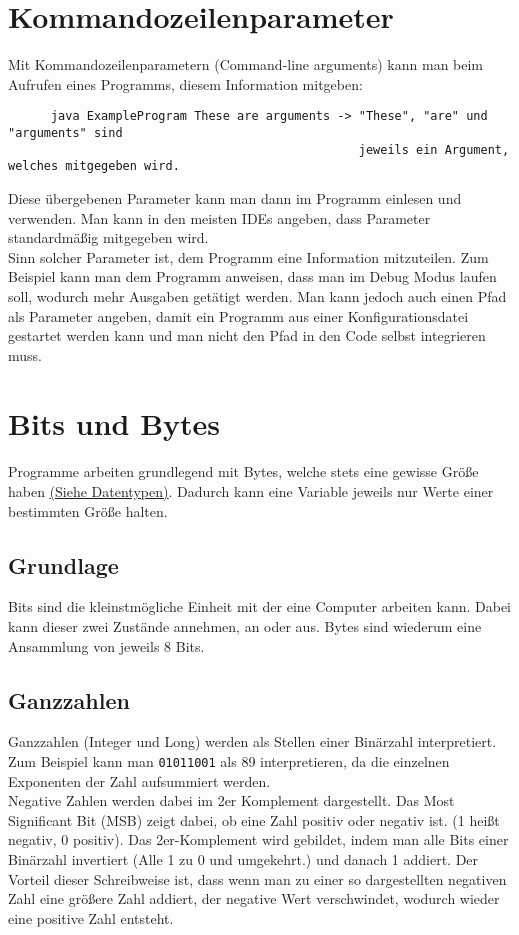 \documentclass{article}
\begin{document}
	  \section{Kommandozeilenparameter}
	  Mit Kommandozeilenparametern (Command-line arguments) kann man beim Aufrufen eines Programms, diesem Information mitgeben:
	  \begin{verbatim}
	  java ExampleProgram These are arguments -> "These", "are" und "arguments" sind 
	                                             jeweils ein Argument, welches mitgegeben wird.
	  \end{verbatim}
	  Diese übergebenen Parameter kann man dann im Programm einlesen und verwenden. Man kann in den meisten IDEs angeben, dass Parameter standardmäßig mitgegeben wird. \\
	  Sinn solcher Parameter ist, dem Programm eine Information mitzuteilen. Zum Beispiel kann man dem Programm anweisen, dass man im Debug Modus laufen soll, wodurch mehr Ausgaben getätigt werden. Man kann jedoch auch einen Pfad als Parameter angeben, damit ein Programm aus einer Konfigurationsdatei gestartet werden kann und man nicht den Pfad in den Code selbst integrieren muss.
	  \section{Bits und Bytes}
	  Programme arbeiten grundlegend mit Bytes, welche stets eine gewisse Größe haben \hyperref[sec:Datentypen]{\underline{(Siehe Datentypen)}}. Dadurch kann eine Variable jeweils nur Werte einer bestimmten Größe halten.
	  \subsection{Grundlage}
	  Bits sind die kleinstmögliche Einheit mit der eine Computer arbeiten kann. Dabei kann dieser zwei Zustände annehmen, an oder aus. Bytes sind wiederum eine Ansammlung von jeweils 8 Bits.
	  \subsection{Ganzzahlen}
	  Ganzzahlen (Integer und Long) werden als Stellen einer Binärzahl interpretiert. \\
	  Zum Beispiel kann man \verb|01011001| als 89 interpretieren, da die einzelnen Exponenten der Zahl aufsummiert werden. \\
	  Negative Zahlen werden dabei im 2er Komplement dargestellt. Das Most Significant Bit (MSB) zeigt dabei, ob eine Zahl positiv oder negativ ist. (1 heißt negativ, 0 positiv). Das 2er-Komplement wird gebildet, indem man alle Bits einer Binärzahl invertiert (Alle 1 zu 0 und umgekehrt.) und danach 1 addiert. Der Vorteil dieser Schreibweise ist, dass wenn man zu einer so dargestellten negativen Zahl eine größere Zahl addiert, der negative Wert verschwindet, wodurch wieder eine positive Zahl entsteht. 
\end{document}
